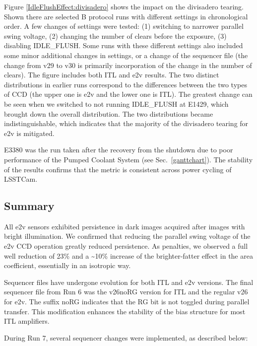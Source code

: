 Figure \ref{IdleFlushEffect:divisadero} shows the impact on the divisadero tearing. Shown there are selected B protocol runs with different settings in chronological order. A few changes of settings were tested: (1) switching to narrower parallel swing voltage, (2) changing the number of clears before the exposure, (3) disabling IDLE\_FLUSH.  Some runs with these different settings also included some minor additional changes in settings, or a change of the sequencer file (the change from v29 to v30  is primarily incorporation of the change in the number of clears). The figure includes both ITL and e2v results. The two distinct distributions in earlier runs correspond to the differences between the two types of CCD (the upper one is e2v and the lower one is ITL). The greatest change can be seen when we switched to not running IDLE\_FLUSH at E1429, which brought down the overall distribution. The two distributions became indistinguishable, which indicates that the majority of the divisadero tearing for e2v is mitigated.

E3380 was the run taken after the recovery from the shutdown due to poor performance of the Pumped Coolant System (see Sec.~\ref{ganttchart}). The stability of the results confirms that the metric is consistent across power cycling of LSSTCam.

\subsection{Summary}\label{summary:optimization}

All e2v sensors exhibited persistence in dark images acquired after images with bright illumination. We confirmed that reducing the parallel swing voltage of the e2v CCD operation greatly reduced persistence. As penalties, we observed a full well reduction of 23\% and a \textasciitilde10\% increase of the
brighter-fatter effect in the area coefficient, essentially in an isotropic way.

Sequencer files have undergone evolution for both ITL and e2v versions.
The final sequencer file from Run 6 was the
v26noRG version for ITL and the regular v26
for e2v. The suffix noRG indicates that the
RG bit is not toggled during parallel transfer. This modification
enhances the stability of the bias structure for most ITL
amplifiers.

During Run 7, several sequencer changes were implemented, as described below:


